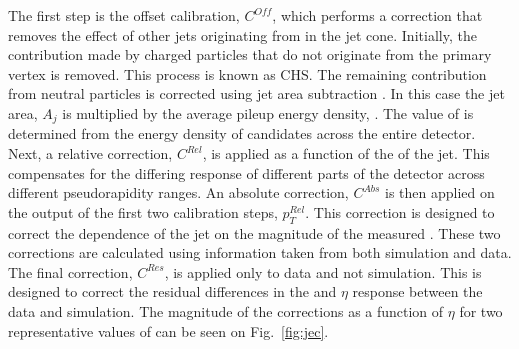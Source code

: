 The first step is the offset calibration, $C^{Off}$, which performs a correction
that removes the effect of other jets originating from \PU in the jet
cone. Initially, the contribution made by charged particles that do
not originate from the primary vertex is removed. This process is
known as \ac{CHS}. The remaining contribution from neutral \PU
particles is corrected using jet area subtraction
\cite{Cacciari:2007fd}. In this case the jet area, $A_j$ is multiplied
by the average pileup energy density, \rho. The value of \rho is
determined from the energy density of \PF candidates across the entire
detector.  Next, a relative correction, $C^{Rel}$, is applied as a
function of the \eta of the jet. This compensates for the differing
response of different parts of the detector across different
pseudorapidity ranges. An absolute correction, $C^{Abs}$ is then
applied on the output of the first two calibration steps, $p_T^{Rel}$.
This correction is designed to correct the dependence of the jet \pT
on the magnitude of the measured \pT. These two corrections are
calculated using information taken from both simulation and data. %
The final correction, $C^{Res}$, is applied only to data and not
simulation. This is designed to correct the residual differences in
the \pT and $\eta$ response between the data and simulation. The
magnitude of the corrections as a function of $\eta$ for two
representative values of \pT can be seen on Fig.~\ref{fig:jec}.


